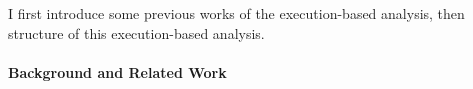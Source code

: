 
I first introduce some previous works of the execution-based analysis, 
then structure of this execution-based analysis.  
 \paragraph*{Background and Related Work}
